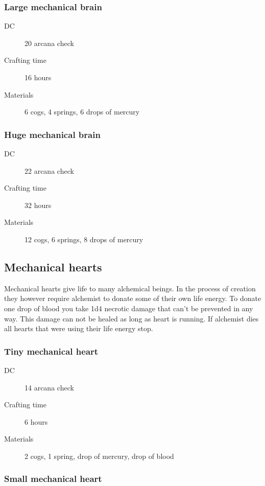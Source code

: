 \subsubsection{Large mechanical brain}

\begin{description}
\item [DC] 20 arcana check
\item [Crafting time] 16 hours
\item [Materials] 6 cogs, 4 springs, 6 drops of mercury
\end{description}

\subsubsection{Huge mechanical brain}

\begin{description}
\item [DC] 22 arcana check
\item [Crafting time] 32 hours
\item [Materials] 12 cogs, 6 springs, 8 drops of mercury
\end{description}

\subsection{Mechanical hearts}

Mechanical hearts give life to many alchemical beings. In the process of creation they however require alchemist to donate some of their own life energy.
To donate one drop of blood you take 1d4 necrotic damage that can't be prevented in any way. This damage can not be healed as long as heart is running. If
alchemist dies all hearts that were using their life energy stop.

\subsubsection{Tiny mechanical heart}

\begin{description}
\item [DC] 14 arcana check
\item [Crafting time] 6 hours
\item [Materials] 2 cogs, 1 spring, drop of mercury, drop of blood
\end{description}

\subsubsection{Small mechanical heart}

